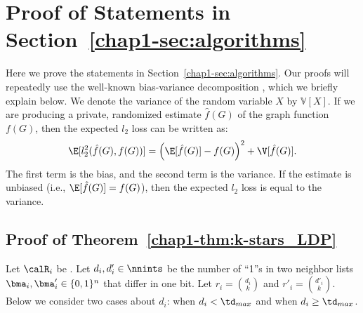 \appendix


\section{Proof of Statements in Section~\ref{chap1-sec:algorithms}}
\label{chap1-sec:proof}
Here we prove the statements in Section~\ref{chap1-sec:algorithms}. 
Our proofs will repeatedly use the well-known bias-variance decomposition \cite{mlpp}, which we briefly explain below. 
We denote the variance of the random variable $X$ by $\mathbb{V}[X]$. 
If we are producing a private, randomized estimate $\hat{f}(G)$ of the graph function $f(G)$, then the expected $l_2$ loss can be written as: 
\begin{equation}\label{chap1-eq:bias-var}
  \E[l_2^2(\hat{f}(G),f(G))] = \left(\E[\hat{f}(G)] - f(G)\right)^2
  + \V[\hat{f}(G)].
\end{equation}
The first term is the bias, and the second term is the variance. 
If the estimate is unbiased (i.e., $\E[\hat{f}(G)] = f(G)$), then the expected $l_2$ loss is equal to the variance.

\subsection{Proof of Theorem~\ref{chap1-thm:k-stars_LDP}}
Let $\calR_i$ be . 
Let $d_i,d'_i \in \nnints$ be the number of ``1''s in two neighbor lists $\bma_i,\bma'_i \in \{0,1\}^n$ that differ in one bit. 
Let $r_i = \binom{d_i}{k}$ and $r'_i = \binom{d'_i}{k}$. 
Below we consider two cases about $d_i$: when $d_i < \td_{max}$ and when $d_i \geq \td_{max}$.

